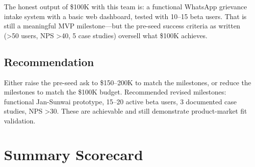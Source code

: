 \documentclass[12pt, a4paper]{article}
\begin{document}
The honest output of \$100K with this team is: a functional WhatsApp grievance intake system with a basic web dashboard, tested with 10--15 beta users. That is still a meaningful MVP milestone---but the pre-seed success criteria as written (\textgreater50 users, NPS \textgreater40, 5 case studies) oversell what \$100K achieves.

\subsection{Recommendation}
Either raise the pre-seed ask to \$150--200K to match the milestones, or reduce the milestones to match the \$100K budget. Recommended revised milestones: functional Jan-Sunwai prototype, 15--20 active beta users, 3 documented case studies, NPS \textgreater30. These are achievable and still demonstrate product-market fit validation.

\newpage

\section{Summary Scorecard}
\end{document}

